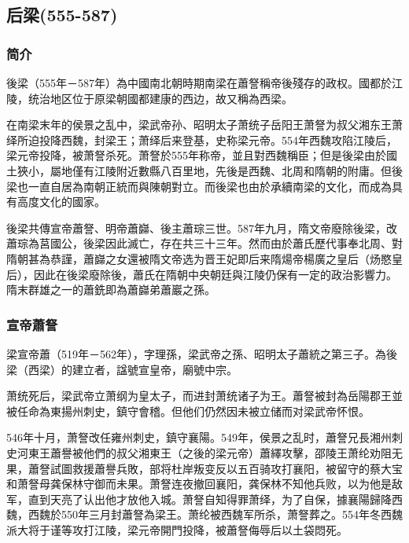 
\subsection{后梁(555-587)}

\subsubsection{简介}

後梁（555年－587年）為中國南北朝時期南梁在蕭詧稱帝後殘存的政权。國都於江陵，统治地区位于原梁朝國都建康的西边，故又稱為西梁。

在南梁末年的侯景之乱中，梁武帝孙、昭明太子萧统子岳阳王萧詧为叔父湘东王萧绎所迫投降西魏，封梁王；萧绎后来登基，史称梁元帝。554年西魏攻陷江陵后，梁元帝投降，被萧詧杀死。萧詧於555年称帝，並且對西魏稱臣；但是後梁由於國土狹小，屬地僅有江陵附近數縣八百里地，先後是西魏、北周和隋朝的附庸。但後梁也一直自居為南朝正統而與陳朝對立。而後梁也由於承續南梁的文化，而成為具有高度文化的國家。

後梁共傳宣帝蕭詧、明帝蕭巋、後主蕭琮三世。587年九月，隋文帝廢除後梁，改蕭琮為莒國公，後梁因此滅亡，存在共三十三年。然而由於蕭氏歷代事奉北周、對隋朝甚為恭謹，蕭巋之女還被隋文帝选为晋王妃即后来隋煬帝楊廣之皇后（炀愍皇后），因此在後梁廢除後，蕭氏在隋朝中央朝廷與江陵仍保有一定的政治影響力。隋末群雄之一的蕭銑即為蕭巋弟蕭巖之孫。

\subsubsection{宣帝蕭詧}

梁宣帝蕭（519年－562年），字理孫，梁武帝之孫、昭明太子蕭統之第三子。為後梁（西梁）的建立者，諡號宣皇帝，廟號中宗。

萧统死后，梁武帝立萧纲为皇太子，而进封萧统诸子为王。蕭詧被封為岳陽郡王並被任命為東揚州刺史，鎮守會稽。但他们仍然因未被立储而对梁武帝怀恨。

546年十月，萧詧改任雍州刺史，鎮守襄陽。549年，侯景之乱时，蕭詧兄長湘州刺史河東王蕭譽被他們的叔父湘東王（之後的梁元帝）蕭繹攻擊，邵陵王萧纶劝阻无果，蕭詧試圖救援蕭譽兵敗，部将杜岸叛变反以五百骑攻打襄阳，被留守的蔡大宝和萧詧母龚保林守御而未果。萧詧连夜撤回襄阳，龚保林不知他兵败，以为他是敌军，直到天亮了认出他才放他入城。萧詧自知得罪萧绎，为了自保，據襄陽歸降西魏，西魏於550年三月封蕭詧為梁王。萧纶被西魏军所杀，萧詧葬之。554年冬西魏派大将于谨等攻打江陵，梁元帝開門投降，被蕭詧侮辱后以土袋悶死。

